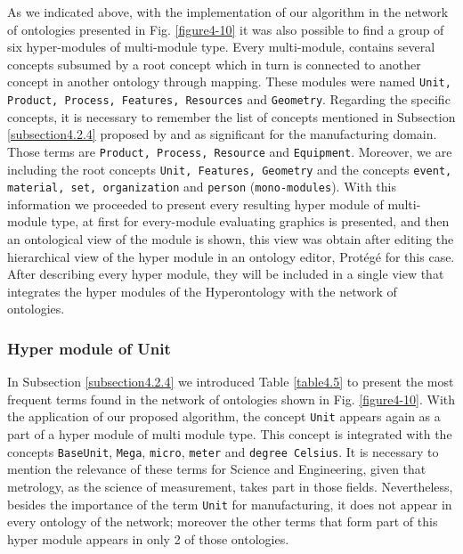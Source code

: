 As we indicated above, with the implementation of our algorithm in the network of ontologies presented in Fig. \ref{figure4-10} it was also possible to find a group of six hyper-modules of multi-module type. Every multi-module, contains several concepts subsumed by a root concept which in turn is connected to another concept in another ontology through mapping. These modules were named \texttt{Unit, Product, Process, Features, Resources} and \texttt{Geometry}. Regarding the specific concepts, it is necessary to remember the list of concepts mentioned in Subsection \ref{subsection4.2.4} proposed by \cite{martin_design_2003} and \cite{lastra_ontologies_2009} as significant for the manufacturing domain. Those terms are \texttt{Product, Process, Resource} and \texttt{Equipment}. Moreover, we are including the root concepts \texttt{Unit, Features, Geometry} and the concepts \texttt{event, material, set, organization} and \texttt{person} (\texttt{mono-modules}). With this information we proceeded to present every resulting hyper module of multi-module type, at first for every-module evaluating graphics is presented, and then an ontological view of the module is shown, this view was obtain after editing the hierarchical view of the hyper module in an ontology editor, Protégé for this case. After describing every hyper module, they will be included in a single view that integrates the hyper modules of the Hyperontology with the network of ontologies.

\subsubsection{Hyper module of Unit}\label{subsubsection4.2.5.1}

In Subsection \ref{subsection4.2.4} we introduced Table \ref{table4.5} to present the most frequent terms found in the network of ontologies shown in Fig. \ref{figure4-10}. With the application of our proposed algorithm, the concept \texttt{Unit} appears again as a part of a hyper module of multi module type. This concept is integrated with the concepts \texttt{BaseUnit}, \texttt{Mega}, \texttt{micro}, \texttt{meter} and \texttt{degree Celsius}. It is necessary to mention the relevance of these terms for Science and Engineering,   given that metrology, as the science of measurement, takes part in those fields. Nevertheless, besides the importance of the term \texttt{Unit} for manufacturing, it  does not appear in every ontology of the network; moreover the other terms that form part of this hyper module appears in only 2 of those ontologies.   

